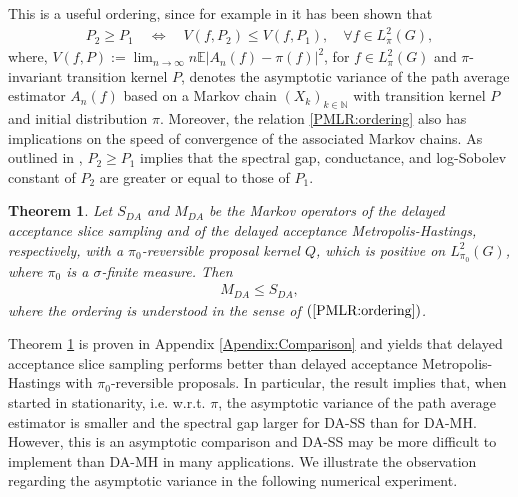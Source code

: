 \documentclass[sn-mathphys-num]{sn-jnl}%
\theoremstyle{thmstyleone}%
\newtheorem{theorem}{Theorem}%
\theoremstyle{thmstyletwo}%
\theoremstyle{thmstylethree}%
\newcommand{\change}[1]{\bgroup\color{black}#1\egroup}    %
\begin{document}
This is a useful ordering, since 
for example in \cite{MiraLeisen2009} it has been shown that
\begin{align*}
	P_2\geq P_1 \quad  \iff \quad V(f, P_2)\leq V(f, P_1), \quad \forall f\in L^2_{\pi}(G), 	
\end{align*}
where, $V(f, P) := \lim_{n\to\infty} n\mathbb E|A_n(f) - \pi(f)|^2$, for $f\in L^2_{\pi}(G)$ and $\pi$-invariant transition kernel $P$, denotes the asymptotic variance of the path average estimator $A_n(f)$ based on a Markov chain $(X_k)_{k\in\mathbb N}$ with transition kernel $P$ and initial distribution $\pi$. 
Moreover, the relation \eqref{PMLR:ordering} also has implications on the speed of convergence of the associated Markov chains. As outlined in \cite{RudolfUllrich2018}, $P_2\geq P_1$ implies that the spectral gap, conductance, and log-Sobolev constant of $P_2$ are greater or equal to those of $P_1$. 
\begin{theorem}\label{PMLR:theorem:comparison}
	Let $S_{DA}$ and $M_{DA}$ be the Markov operators of the delayed acceptance slice sampling and of the delayed acceptance Metropolis-Hastings, respectively, with a $\pi_0$-reversible proposal kernel $Q$, which is positive on $L^2_{\pi_0}(G)$, where $\pi_0$ is a $\sigma$-finite measure. Then
	\begin{align*}
		M_{DA}\leq S_{DA}, 
	\end{align*}   
\change{where the ordering is understood in the %
sense of $(\ref{PMLR:ordering})$}.
\end{theorem}

Theorem \ref{PMLR:theorem:comparison} is proven in Appendix \ref{Apendix:Comparison} and yields that delayed acceptance slice sampling performs better than delayed acceptance Metropolis-Hastings with $\pi_0$-reversible proposals.
\change{In particular, the result implies that, when started in stationarity, i.e. w.r.t. $\pi$, the asymptotic variance of the path average estimator is smaller and the spectral gap larger for DA-SS than for DA-MH. However, this is an asymptotic comparison and DA-SS may be more difficult to implement than DA-MH in many applications. We illustrate the observation regarding the asymptotic variance in the following numerical experiment.}
\end{document}
